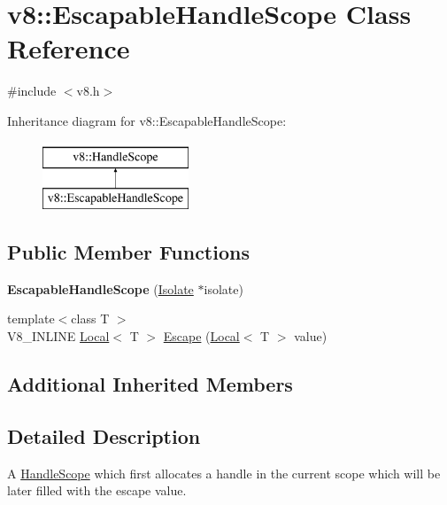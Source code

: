 \hypertarget{classv8_1_1EscapableHandleScope}{}\section{v8\+:\+:Escapable\+Handle\+Scope Class Reference}
\label{classv8_1_1EscapableHandleScope}


{\ttfamily \#include $<$v8.\+h$>$}

Inheritance diagram for v8\+:\+:Escapable\+Handle\+Scope\+:\begin{figure}[H]
\begin{center}
\leavevmode
\includegraphics[height=2.000000cm]{classv8_1_1EscapableHandleScope}
\end{center}
\end{figure}
\subsection*{Public Member Functions}
\begin{DoxyCompactItemize}
\item 
\hypertarget{classv8_1_1EscapableHandleScope_aea39a7fd4dee6da31f3921ff891e1731}{}{\bfseries Escapable\+Handle\+Scope} (\hyperlink{classv8_1_1Isolate}{Isolate} $\ast$isolate)\label{classv8_1_1EscapableHandleScope_aea39a7fd4dee6da31f3921ff891e1731}

\item 
{\footnotesize template$<$class T $>$ }\\V8\+\_\+\+I\+N\+L\+I\+N\+E \hyperlink{classv8_1_1Local}{Local}$<$ T $>$ \hyperlink{classv8_1_1EscapableHandleScope_afdf0d3850978f65d1a827f78b3a2b6fd}{Escape} (\hyperlink{classv8_1_1Local}{Local}$<$ T $>$ value)
\end{DoxyCompactItemize}
\subsection*{Additional Inherited Members}


\subsection{Detailed Description}
A \hyperlink{classv8_1_1HandleScope}{Handle\+Scope} which first allocates a handle in the current scope which will be later filled with the escape value. 

